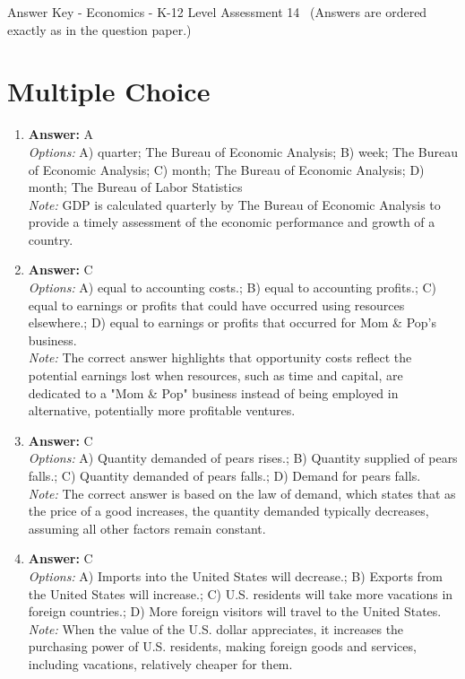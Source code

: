 \documentclass[12pt]{article}
\begin{document}
\begin{center}
Answer Key - Economics - K-12 Level Assessment 14 \
\small (Answers are ordered exactly as in the question paper.)
\end{center}

\section*{Multiple Choice}
\begin{enumerate}[label=\arabic*.]
\item \textbf{Answer:} A
\\ \textit{Options:} A) quarter; The Bureau of Economic Analysis; B) week; The Bureau of Economic Analysis; C) month; The Bureau of Economic Analysis; D) month; The Bureau of Labor Statistics
\\ \textit{Note:} GDP is calculated quarterly by The Bureau of Economic Analysis to provide a timely assessment of the economic performance and growth of a country.
\item \textbf{Answer:} C
\\ \textit{Options:} A) equal to accounting costs.; B) equal to accounting profits.; C) equal to earnings or profits that could have occurred using resources elsewhere.; D) equal to earnings or profits that occurred for Mom \& Pop's business.
\\ \textit{Note:} The correct answer highlights that opportunity costs reflect the potential earnings lost when resources, such as time and capital, are dedicated to a "Mom \& Pop" business instead of being employed in alternative, potentially more profitable ventures.
\item \textbf{Answer:} C
\\ \textit{Options:} A) Quantity demanded of pears rises.; B) Quantity supplied of pears falls.; C) Quantity demanded of pears falls.; D) Demand for pears falls.
\\ \textit{Note:} The correct answer is based on the law of demand, which states that as the price of a good increases, the quantity demanded typically decreases, assuming all other factors remain constant.
\item \textbf{Answer:} C
\\ \textit{Options:} A) Imports into the United States will decrease.; B) Exports from the United States will increase.; C) U.S. residents will take more vacations in foreign countries.; D) More foreign visitors will travel to the United States.
\\ \textit{Note:} When the value of the U.S. dollar appreciates, it increases the purchasing power of U.S. residents, making foreign goods and services, including vacations, relatively cheaper for them.

\end{enumerate}
\end{document}
